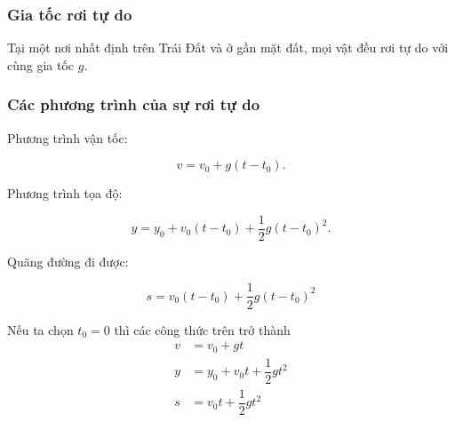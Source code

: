 \subsubsection{Gia tốc rơi tự do}
Tại một nơi nhất định trên Trái Đất và ở gần mặt đất, mọi vật đều rơi tự do với cùng gia tốc $g$.

\subsubsection{Các phương trình của sự rơi tự do}

Phương trình vận tốc:

\begin{equation*}
	v = v_0+g(t -t_0).
\end{equation*}

Phương trình tọa độ:

\begin{equation*}
	y = y_0 +v_0(t-t_0)+ \dfrac{1}{2}g(t -t_0)^2.
\end{equation*}

Quãng đường đi được:

\begin{equation*}
	s = v_0(t-t_0)+\dfrac{1}{2} g (t-t_0)^2
\end{equation*}

Nếu ta chọn $t_{0}=0$ thì các công thức trên trở thành
\begin{align*}
	v&=v_0+gt\\	
	y&=y_0+v_0t+\dfrac{1}{2}gt^{2}\\
	s&=v_{0}t+\dfrac{1}{2}gt^{2}
\end{align*}
	

	

